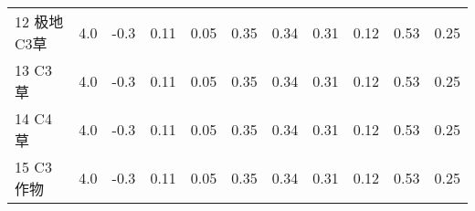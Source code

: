 \begin{landscape}
\begin{table}[htbp]
\begin{tabular}{@{}lcccccccccc@{}}
% 
%
            12 极地C3草 & 4.0 & -0.3 & 0.11 & 0.05 & 0.35 & 0.34 & 0.31 & 0.12 & 0.53 & 0.25 \\
            13 C3草   & 4.0 & -0.3 & 0.11 & 0.05 & 0.35 & 0.34 & 0.31 & 0.12 & 0.53 & 0.25   \\
            14 C4草   & 4.0 & -0.3 & 0.11 & 0.05 & 0.35 & 0.34 & 0.31 & 0.12 & 0.53 & 0.25   \\
            15 C3作物  & 4.0 & -0.3 & 0.11 & 0.05 & 0.35 & 0.34 & 0.31 & 0.12 & 0.53 & 0.25  \\\bottomrule
        \end{tabular}
\end{table}
\end{landscape}


